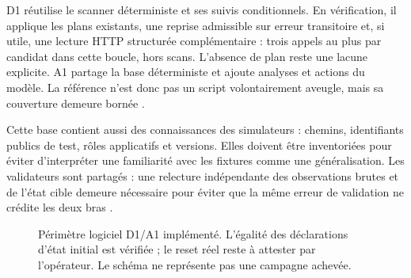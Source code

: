 \documentclass[11pt,a4paper]{article}
\begin{document}
D1 réutilise le scanner déterministe et ses suivis conditionnels. En vérification,
il applique les plans existants, une reprise admissible sur erreur transitoire
et, si utile, une lecture HTTP structurée complémentaire : trois appels au plus
par candidat dans cette boucle, hors scans. L'absence de plan reste une lacune
explicite. A1 partage la base déterministe et ajoute analyses et actions du
modèle. La référence n'est donc pas un script volontairement aveugle, mais sa
couverture demeure bornée \cite{bench-cli,bench-rules}.

Cette base contient aussi des connaissances des simulateurs : chemins,
identifiants publics de test, rôles applicatifs et versions. Elles doivent être
inventoriées pour éviter d'interpréter une familiarité avec les fixtures comme
une généralisation. Les validateurs sont partagés : une relecture indépendante
des observations brutes et de l'état cible demeure nécessaire pour éviter que
la même erreur de validation ne crédite les deux bras \cite{bench-campagne}.

\begin{figure}[htbp]
\centering
{}
\caption{Périmètre logiciel D1/A1 implémenté. L'égalité des déclarations
d'état initial est vérifiée ; le reset réel reste à attester par l'opérateur.
Le schéma ne représente pas une campagne achevée.}
\label{fig:bench-parite}
\end{figure}
\end{document}
